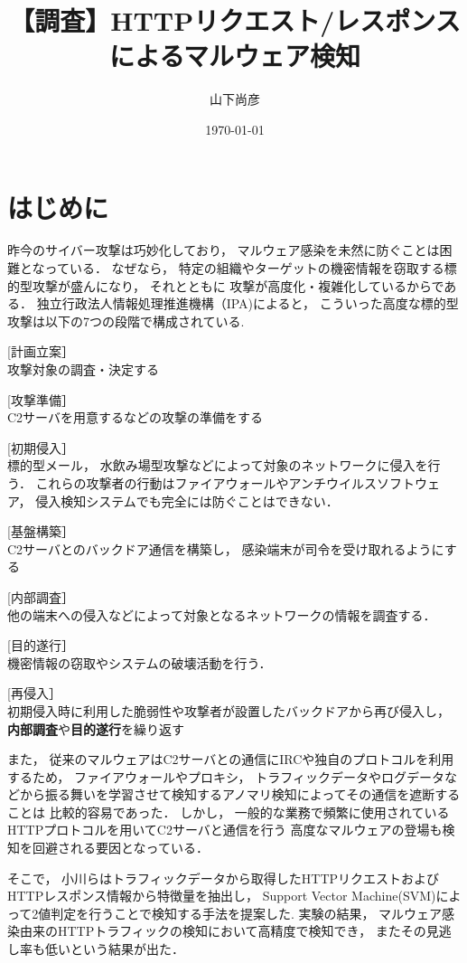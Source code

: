 \documentclass[twocolumn,10pt]{ltjsarticle}
\title{【調査】HTTPリクエスト/レスポンスによるマルウェア検知}
\author{山下尚彦}
\date{\today}
\begin{document}
\maketitle

\section{はじめに}
昨今のサイバー攻撃は巧妙化しており， マルウェア感染を未然に防ぐことは困難となっている． 
なぜなら， 特定の組織やターゲットの機密情報を窃取する標的型攻撃が盛んになり， それとともに
攻撃が高度化・複雑化しているからである． 独立行政法人情報処理推進機構（IPA)によると， 
こういった高度な標的型攻撃は以下の7つの段階で構成されている\cite{IPA2014高度標的型攻撃}. 

\begin{description}
    \item[計画立案］~\\
    攻撃対象の調査・決定する

    \item[攻撃準備］~\\
    C2サーバを用意するなどの攻撃の準備をする 

    \item[初期侵入］~\\
    標的型メール， 水飲み場型攻撃などによって対象のネットワークに侵入を行う． 
    これらの攻撃者の行動はファイアウォールやアンチウイルスソフトウェア， 侵入検知システムでも完全には防ぐことはできない． 
    
    \item[基盤構築］~\\
    C2サーバとのバックドア通信を構築し， 感染端末が司令を受け取れるようにする

    \item[内部調査］~\\
    他の端末への侵入などによって対象となるネットワークの情報を調査する． 

    \item[目的遂行］~\\
    機密情報の窃取やシステムの破壊活動を行う． 

    \item[再侵入］~\\ 
    初期侵入時に利用した脆弱性や攻撃者が設置したバックドアから再び侵入し， 
    \textbf{内部調査}や\textbf{目的遂行}を繰り返す
\end{description}

また， 従来のマルウェアはC2サーバとの通信にIRCや独自のプロトコルを利用するため， ファイアウォールやプロキシ， 
トラフィックデータやログデータなどから振る舞いを学習させて検知するアノマリ検知によってその通信を遮断することは
比較的容易であった． しかし， 一般的な業務で頻繁に使用されているHTTPプロトコルを用いてC2サーバと通信を行う
高度なマルウェアの登場も検知を回避される要因となっている． \par
そこで， 小川らはトラフィックデータから取得したHTTPリクエストおよびHTTPレスポンス情報から特徴量を抽出し， 
Support Vector Machine(SVM)によって2値判定を行うことで検知する手法を提案した\cite{小川秀貴2016リクエスト間隔}. 
実験の結果， マルウェア感染由来のHTTPトラフィックの検知において高精度で検知でき， 
またその見逃し率も低いという結果が出た． 
\end{document}
